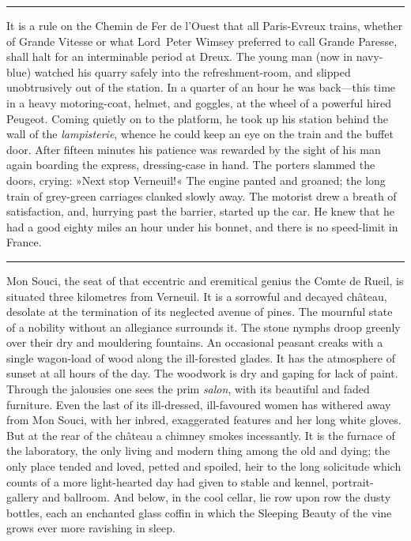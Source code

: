 \noindent\hfil\rule{0.5\textwidth}{.4pt}\hfil 

It is a rule on the Chemin de Fer de l'Ouest that all Paris-Evreux trains, whether of Grande Vitesse or what Lord~Peter Wimsey preferred to call Grande Paresse, shall halt for an interminable period at Dreux. The young man (now in navy-blue) watched his quarry safely into the refreshment-room, and slipped unobtrusively out of the station. In a quarter of an hour he was back—this time in a heavy motoring-coat, helmet, and goggles, at the wheel of a powerful hired Peugeot. Coming quietly on to the platform, he took up his station behind the wall of the \textit{lampisterie}, whence he could keep an eye on the train and the buffet door. After fifteen minutes his patience was rewarded by the sight of his man again boarding the express, dressing-case in hand. The porters slammed the doors, crying: »Next stop Verneuil!« The engine panted and groaned; the long train of grey-green carriages clanked slowly away. The motorist drew a breath of satisfaction, and, hurrying past the barrier, started up the car. He knew that he had a good eighty miles an hour under his bonnet, and there is no speed-limit in France.

\noindent\hfil\rule{0.5\textwidth}{.4pt}\hfil 

Mon Souci, the seat of that eccentric and eremitical genius the Comte de Rueil, is situated three kilometres from Verneuil. It is a sorrowful and decayed château, desolate at the termination of its neglected avenue of pines. The mournful state of a nobility without an allegiance surrounds it. The stone nymphs droop greenly over their dry and mouldering fountains. An occasional peasant creaks with a single wagon-load of wood along the ill-forested glades. It has the atmosphere of sunset at all hours of the day. The woodwork is dry and gaping for lack of paint. Through the jalousies one sees the prim \textit{salon}, with its beautiful and faded furniture. Even the last of its ill-dressed, ill-favoured women has withered away from Mon Souci, with her inbred, exaggerated features and her long white gloves. But at the rear of the château a chimney smokes incessantly. It is the furnace of the laboratory, the only living and modern thing among the old and dying; the only place tended and loved, petted and spoiled, heir to the long solicitude which counts of a more light-hearted day had given to stable and kennel, portrait-gallery and ballroom. And below, in the cool cellar, lie row upon row the dusty bottles, each an enchanted glass coffin in which the Sleeping Beauty of the vine grows ever more ravishing in sleep.

